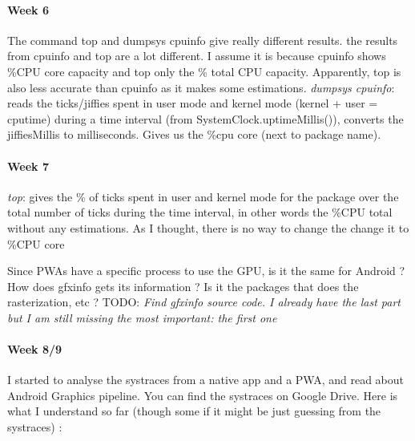 \documentclass{kththesis}
\begin{document}
\paragraph{Week 6}
The command top and dumpsys cpuinfo give really different results.
the results from cpuinfo and top are a lot different. I assume it is because cpuinfo shows \%CPU core capacity and top only the \% total CPU capacity. Apparently, top is also less accurate than cpuinfo as it makes some estimations.
\textit{dumpsys cpuinfo}: reads the ticks/jiffies spent in user mode and kernel mode (kernel + user = cputime) during a time interval (from SystemClock.uptimeMillis()), converts the jiffiesMillis to milliseconds. Gives us the \%cpu core (next to package name).
\newline
\paragraph{Week 7}
\textit{top}: gives the \% of ticks spent in user and kernel mode for the package over the total number of ticks during the time interval, in other words the \%CPU total without any estimations. As I thought, there is no way to change the change it to \%CPU core

Since PWAs have a specific process to use the GPU, is it the same for Android ? How does gfxinfo gets its information ? Is it the packages that does the rasterization, etc ?
\newline
TODO: \textit{Find gfxinfo source code. I already have the last part but I am still missing the most important: the first one}

\paragraph{Week 8/9}
I started to analyse the systraces from a native app and a PWA, and read about Android Graphics pipeline. You can find the systraces on Google Drive. Here is what I understand so far (though some if it might be just guessing from the systraces) : 
\end{document}
